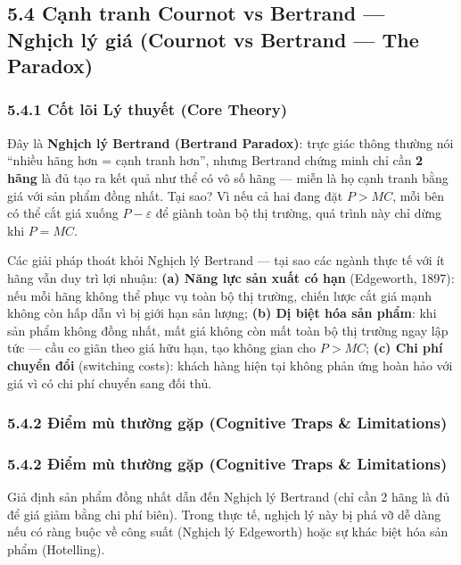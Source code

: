 \documentclass[
]{article}
\begin{document}
\subsection{5.4 Cạnh tranh Cournot vs Bertrand --- Nghịch lý giá
(Cournot vs Bertrand --- The
Paradox)}\label{cux1ea1nh-tranh-cournot-vs-bertrand-nghux1ecbch-luxfd-giuxe1-cournot-vs-bertrand-the-paradox}

\subsubsection{5.4.1 Cốt lõi Lý thuyết (Core
Theory)}\label{cux1ed1t-luxf5i-luxfd-thuyux1ebft-core-theory-4}

Đây là \textbf{Nghịch lý Bertrand (Bertrand Paradox)}: trực giác thông
thường nói ``nhiều hãng hơn = cạnh tranh hơn'', nhưng Bertrand chứng
minh chỉ cần \textbf{2 hãng} là đủ tạo ra kết quả như thể có vô số hãng
--- miễn là họ cạnh tranh bằng giá với sản phẩm đồng nhất. Tại sao? Vì
nếu cả hai đang đặt \(P > MC\), mỗi bên có thể cắt giá xuống
\(P - \varepsilon\) để giành toàn bộ thị trường, quá trình này chỉ dừng
khi \(P = MC\).

Các giải pháp thoát khỏi Nghịch lý Bertrand --- tại sao các ngành thực
tế với ít hãng vẫn duy trì lợi nhuận: \textbf{(a) Năng lực sản xuất có
hạn} (Edgeworth, 1897): nếu mỗi hãng không thể phục vụ toàn bộ thị
trường, chiến lược cắt giá mạnh không còn hấp dẫn vì bị giới hạn sản
lượng; \textbf{(b) Dị biệt hóa sản phẩm}: khi sản phẩm không đồng nhất,
mất giá không còn mất toàn bộ thị trường ngay lập tức --- cầu co giãn
theo giá hữu hạn, tạo không gian cho \(P > MC\); \textbf{(c) Chi phí
chuyển đổi} (switching costs): khách hàng hiện tại không phản ứng hoàn
hảo với giá vì có chi phí chuyển sang đối thủ.

\subsubsection{5.4.2 Điểm mù thường gặp (Cognitive Traps \&
Limitations)}\label{ux111iux1ec3m-muxf9-thux1b0ux1eddng-gux1eb7p-cognitive-traps-limitations-7}

\subsubsection{5.4.2 Điểm mù thường gặp (Cognitive Traps \&
Limitations)}\label{ux111iux1ec3m-muxf9-thux1b0ux1eddng-gux1eb7p-cognitive-traps-limitations-8}

Giả định sản phẩm đồng nhất dẫn đến Nghịch lý Bertrand (chỉ cần 2 hãng
là đủ để giá giảm bằng chi phí biên). Trong thực tế, nghịch lý này bị
phá vỡ dễ dàng nếu có ràng buộc về công suất (Nghịch lý Edgeworth) hoặc
sự khác biệt hóa sản phẩm (Hotelling).
\end{document}
